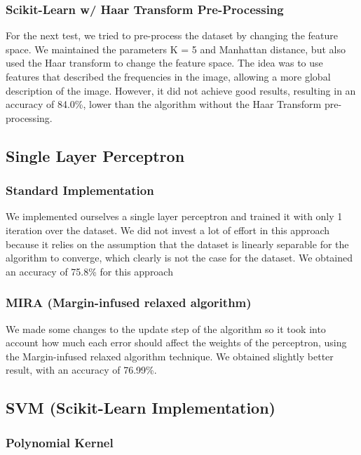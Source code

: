 \documentclass[twoside,twocolumn]{article}
\begin{document}
\subsubsection{Scikit-Learn w/ Haar Transform Pre-Processing}

For the next test, we tried to pre-process the dataset by changing the feature space. We  maintained the parameters K = 5 and
Manhattan distance, but also used the Haar transform to change the feature space. The idea was to use features that described the frequencies
in the image, allowing a more global description of the image. However, it did not achieve good results, resulting in an accuracy of 84.0\%, lower than
the algorithm without the Haar Transform pre-processing.

\subsection{Single Layer Perceptron}

\subsubsection{Standard Implementation}

We implemented ourselves a single layer perceptron and trained it with only 1 iteration over the dataset.
We did not invest a lot of effort in this approach because it relies on the assumption that the dataset
is linearly separable for the algorithm to converge, which clearly is not the case for the dataset.
We obtained an accuracy of 75.8\% for this approach

\subsubsection{MIRA (Margin-infused relaxed algorithm)}

We made some changes to the update step of the algorithm so it took into account how much
each error should affect the weights of the perceptron, using the Margin-infused relaxed algorithm
technique. We obtained slightly better result, with an accuracy of 76.99\%.

\subsection{SVM (Scikit-Learn Implementation)}

\subsubsection{Polynomial Kernel}
\end{document}
